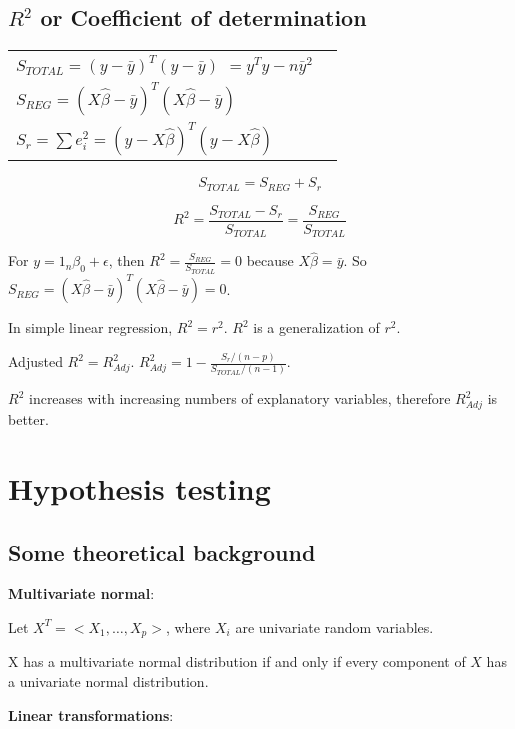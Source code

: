 \subsection{$R^2$ or Coefficient of determination}

\begin{tabular}{@{}ll@{}}
$S_{TOTAL} = (y-\bar{y})^T(y-\bar{y})$  $= y^T y - n\bar{y}^2$ & \\
$S_{REG} = (X\hat{\beta}-\bar{y})^T (X\hat{\beta}-\bar{y})$ & \\
$S_r = \sum e_i^2 = (y-X\hat{\beta})^T (y-X\hat{\beta})$ & \\
\end{tabular}

\begin{equation}
S_{TOTAL} = S_{REG}+ S_r
\end{equation}

\begin{equation}
R^2 = \frac{S_{TOTAL}-S_r}{S_{TOTAL}} = \frac{S_{REG}}{S_{TOTAL}}
\end{equation}

For $y = 1_n \beta_0 + \epsilon$, then $R^2 = \frac{S_{REG}}{S_{TOTAL}} = 0$ because $X\hat{\beta} = \bar{y}$. So $S_{REG} = (X\hat{\beta} - \bar{y})^T (X\hat{\beta} - \bar{y}) = 0$.

In simple linear regression, $R^2 = r^2$.  $R^2$ is a generalization of $r^2$.

Adjusted $R^2= R_{Adj}^2$.  $R_{Adj}^2= 1-\frac{S_r/(n-p)}{S_{TOTAL}/(n-1)}$. 

$R^2$ increases with increasing numbers of explanatory variables, therefore $R_{Adj}^2$ is better. 


\section{Hypothesis testing}

\subsection{Some theoretical background}

\textbf{Multivariate normal}:

Let $X^T = < X_1,\dots,X_p>$, where $X_i$ are univariate random variables.

X has a multivariate normal distribution if and only if every component of $X$ has a univariate normal distribution.


\textbf{Linear transformations}:

